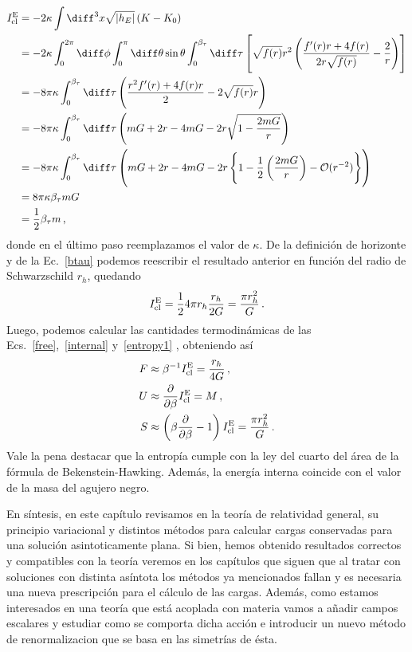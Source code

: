 \documentclass[../Main.tex]{subfiles}
\begin{document}
\begin{align}\notag
I^{\rm E}_{\rm cl}&=-2\kappa\int \diff^3 x \sqrt{\lvert h_E \rvert}\, (K-K_0)\\ \notag
&=-2\kappa\int^{2\pi}_{0}\diff\phi\int^{\pi}_{0}\diff\theta\sin\theta\int^{\beta_\tau}_{0}\diff\tau\left[\sqrt{f(r)}r^2\left(\frac{f'(r)r+4f(r)}{2r\sqrt{f(r)}}-\frac{2}{r}\right)\right]\\ \notag
&=-8\pi\kappa\int^{\beta_\tau}_{0}\diff\tau\left(\frac{r^{2}f'(r)+4f(r)r}{2}-2\sqrt{f(r)}r\right)\\ \notag
&=-8\pi\kappa\int^{\beta_\tau}_{0}\diff\tau\left(mG+2r-4mG-2r\sqrt{1-\frac{2mG}{r}}\right)\\ \notag
&=-8\pi\kappa\int^{\beta_\tau}_{0}\diff\tau\left(mG+2r-4mG-2r\left\{1-\frac{1}{2}\left(\frac{2mG}{r}\right)-\mathcal{O}(r^{-2})\right\}\right)\\ \notag
&=8\pi\kappa\beta_\tau mG\\
 &=\frac{1}{2}\beta_\tau m\, ,
\end{align}
donde en el último paso reemplazamos el valor de $\kappa$. De la definición de horizonte y de la Ec.~\eqref{btau} podemos reescribir el resultado anterior en función del radio de Schwarzschild $r_h$, quedando
\begin{align}
    I^{\rm E}_{\rm cl}=\frac{1}{2}4\pi r_h\frac{r_h}{2G}=\frac{\pi r_{h}^2}{G}\, .
\end{align}
Luego, podemos calcular las cantidades termodinámicas de las Ecs.~\eqref{free},~\eqref{internal} y~\eqref{entropy1} , obteniendo así 
\begin{align}
    F&\approx\beta^{-1}I^{\rm E}_{\rm cl}=\frac{r_h}{4G}\, ,\\ 
    U&\approx\frac{\partial}{\partial\beta}I^{\rm E}_{\rm cl} =M\, ,\\ 
    S&\approx\left(\beta\frac{\partial}{\partial\beta}-1\right)I^{\rm E}_{\rm cl}=\frac{\pi r_{h}^2}{G}\, .
\end{align}
Vale la pena destacar que la entropía cumple con la ley del cuarto del área de la fórmula de Bekenstein-Hawking. Además, la energía interna coincide con el valor de la masa del agujero negro.

En síntesis, en este capítulo revisamos en la teoría de relatividad general, su principio variacional y distintos métodos para calcular cargas conservadas para una solución asintoticamente plana. Si bien, hemos obtenido resultados correctos y compatibles con la teoría veremos en los capítulos que siguen que al tratar con soluciones con distinta asíntota los métodos ya mencionados fallan y es necesaria una nueva prescripción para el cálculo de las cargas. Además, como estamos interesados en una teoría que está acoplada con materia vamos a añadir campos escalares y estudiar como se comporta dicha acción e introducir un nuevo método de renormalizacion que se basa en las simetrías de ésta.










\biblio %
\end{document}
